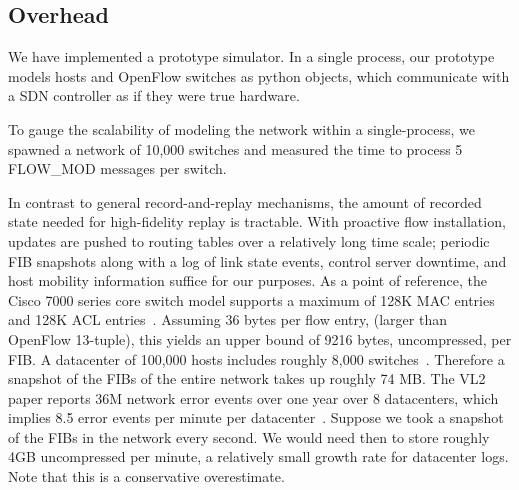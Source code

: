 \subsection{Overhead}

 We have implemented a prototype
simulator. In a single process, our prototype models hosts and OpenFlow switches 
as python objects, which communicate with a SDN controller as if they were
true hardware.

To gauge the scalability of modeling the network within a single-process,
we  spawned a network of 10,000 switches and measured the
time to process 5 FLOW\_MOD messages per switch. 


 In contrast to general record-and-replay
mechanisms, the amount of recorded state needed for
high-fidelity replay is tractable. With proactive flow installation, 
updates are pushed to routing tables over a relatively long time scale; periodic
FIB snapshots along with a log of link state events, control server
downtime, and host mobility information suffice for our purposes. As a point of reference, the Cisco 7000 series
core switch model supports a maximum of 128K MAC entries and
128K ACL entries~\cite{cisco7000}. Assuming 36 bytes per flow entry,
(larger than OpenFlow 13-tuple), this yields
an upper bound of 9216 bytes, uncompressed, per FIB. A datacenter of 100,000
hosts includes roughly 8,000 switches~\cite{Al-Fares:2008:SCD:1402946.1402967}.
Therefore a snapshot of the FIBs of the entire network takes up roughly 74 MB.
The VL2 paper reports 36M network error events over one year over 8
datacenters, which implies 8.5 error events per minute per
datacenter~\cite{Greenberg:2009:VSF:1592568.1592576}.
Suppose we took a snapshot of the FIBs in the network every second. 
We would need then to store roughly 4GB uncompressed per minute, a relatively small growth 
rate for datacenter logs. Note that this is a conservative overestimate.

